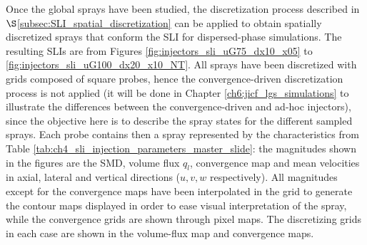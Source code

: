 


\newcommand\scaleSLIJICF{0.15}


Once the global sprays have been studied, the discretization process described in $\S$\ref{subsec:SLI_spatial_discretization} can be applied to obtain spatially discretized sprays that conform the SLI for dispersed-phase simulations. The resulting SLIs are from Figures \ref{fig:injectors_sli_uG75_dx10_x05} to \ref{fig:injectors_sli_uG100_dx20_x10_NT}. All sprays have been discretized with grids composed of square probes, hence the convergence-driven discretization process is not applied (it will be done in Chapter \ref{ch6:jicf_lgs_simulations} to illustrate the differences between the convergence-driven and ad-hoc injectors), since the objective here is to describe the spray states for the different sampled sprays. Each probe contains then a spray represented by the characteristics from Table \ref{tab:ch4_sli_injection_parameters_master_slide}: the magnitudes shown in the figures are the SMD, volume flux $q_l$, convergence map and mean velocities in axial, lateral and vertical directions ($u, v, w$ respectively). All magnitudes except for the convergence maps have been interpolated in the grid to generate the contour maps displayed in order to ease visual interpretation of the spray, while the convergence grids are shown through pixel maps. The discretizing grids in each case are shown in the volume-flux map and convergence maps.


